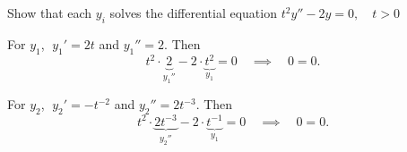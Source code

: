 Show that each $y_i$ solves the differential equation $t^2y'' -2y = 0, \quad t>0$

\soln For $y_1$, $\;{y_1}' = 2t$ and ${y_1}'' = 2$. Then 
$$t^2 \cdot \underbrace{2}_{{y_1}''} - 2\cdot\underbrace{t^2}_{y_1}  = 0 \quad \implies \quad 0 = 0.$$

\nl For $y_2$, $\;{y_2}' = -t^{-2}$ and ${y_2}'' = 2t^{-3}$. Then 
$$t^2 \cdot \underbrace{ 2t^{-3} }_{{y_2}''} - 2\cdot\underbrace{t^{-1}}_{y_1}  = 0 \quad \implies \quad 0 = 0.$$